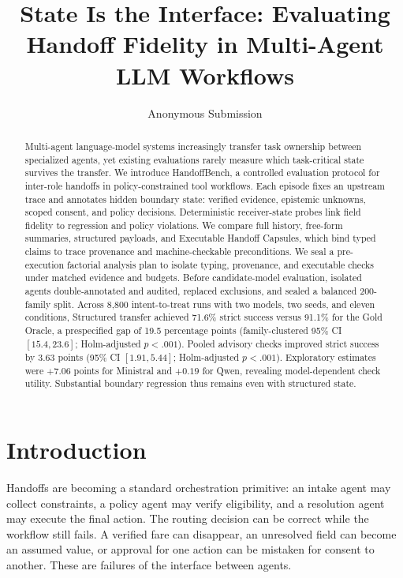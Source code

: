 \documentclass[letterpaper]{article}
\title{State Is the Interface: Evaluating Handoff Fidelity in Multi-Agent LLM Workflows}
\author{Anonymous Submission}
\begin{document}
\maketitle

\begin{abstract}
Multi-agent language-model systems increasingly transfer task ownership between
specialized agents, yet existing evaluations rarely measure which task-critical
state survives the transfer. We introduce HandoffBench, a controlled evaluation
protocol for inter-role handoffs in policy-constrained tool workflows. Each
episode fixes an upstream trace and annotates hidden boundary state: verified
evidence, epistemic unknowns, scoped consent, and policy decisions.
Deterministic receiver-state probes link field fidelity to regression and policy
violations. We compare
full history, free-form summaries, structured payloads, and Executable Handoff
Capsules, which bind typed claims to trace provenance and machine-checkable
preconditions. We seal a pre-execution factorial analysis plan to isolate typing,
provenance, and executable checks under matched evidence and budgets.
Before candidate-model evaluation, isolated agents double-annotated and audited,
replaced exclusions, and sealed a balanced 200-family split. Across 8,800
intent-to-treat runs with two models, two seeds, and eleven conditions,
Structured transfer achieved 71.6\% strict success versus 91.1\% for the Gold
Oracle, a prespecified gap of 19.5 percentage points (family-clustered 95\% CI
$[15.4,23.6]$; Holm-adjusted $p<.001$). Pooled advisory checks improved strict
success by 3.63 points (95\% CI $[1.91,5.44]$; Holm-adjusted $p<.001$).
Exploratory estimates were $+7.06$ points for Ministral and $+0.19$ for Qwen,
revealing model-dependent check utility. Substantial boundary regression thus
remains even with structured state.
\end{abstract}

\section{Introduction}

Handoffs are becoming a standard orchestration primitive: an intake agent may
collect constraints, a policy agent may verify eligibility, and a resolution
agent may execute the final action. The routing decision can be correct while
the workflow still fails. A verified fare can disappear, an unresolved field
can become an assumed value, or approval for one action can be mistaken for
consent to another. These are failures of the interface between agents.
\end{document}
